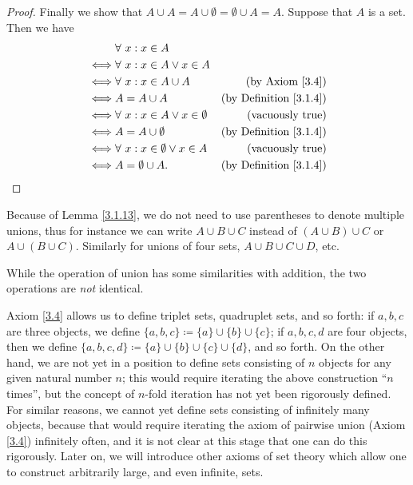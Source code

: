 \begin{proof}
Finally we show that \(A \cup A = A \cup \emptyset = \emptyset \cup A = A\).
Suppose that \(A\) is a set.
Then we have
\begin{align*}
& \forall\ x : x \in A \\
\iff & \forall\ x : x \in A \lor x \in A \\
\iff & \forall\ x : x \in A \cup A & \text{(by Axiom \ref{3.4})} \\
\iff & A = A \cup A & \text{(by Definition \ref{3.1.4})} \\
\iff & \forall\ x : x \in A \lor x \in \emptyset & \text{(vacuously true)} \\
\iff & A = A \cup \emptyset & \text{(by Definition \ref{3.1.4})} \\
\iff & \forall\ x : x \in \emptyset \lor x \in A & \text{(vacuously true)} \\
\iff & A = \emptyset \cup A. & \text{(by Definition \ref{3.1.4})}
\end{align*}
\end{proof}

\begin{note}
Because of Lemma \ref{3.1.13}, we do not need to use parentheses to denote multiple unions, thus for instance we can write \(A \cup B \cup C\) instead of \((A \cup B) \cup C\) or \(A \cup (B \cup C)\).
Similarly for unions of four sets, \(A \cup B \cup C \cup D\), etc.
\end{note}

\begin{remark}\label{3.1.14}
While the operation of union has some similarities with addition, the two operations are \emph{not} identical.
\end{remark}

\begin{note}
Axiom \ref{3.4} allows us to define triplet sets, quadruplet sets, and so forth: if \(a, b, c\) are three objects, we define \(\{a, b, c\} \coloneqq \{a\} \cup \{b\} \cup \{c\}\);
if \(a, b, c, d\) are four objects, then we define \(\{a, b, c, d\} \coloneqq \{a\} \cup \{b\} \cup \{c\} \cup \{d\}\), and so forth.
On the other hand, we are not yet in a position to define sets consisting of \(n\) objects for any given natural number \(n\);
this would require iterating the above construction ``\(n\) times'', but the concept of \(n\)-fold iteration has not yet been rigorously defined.
For similar reasons, we cannot yet define sets consisting of infinitely many objects, because that would require iterating the axiom of pairwise union (Axiom \ref{3.4}) infinitely often, and it is not clear at this stage that one can do this rigorously.
Later on, we will introduce other axioms of set theory which allow one to construct arbitrarily large, and even infinite, sets.
\end{note}

